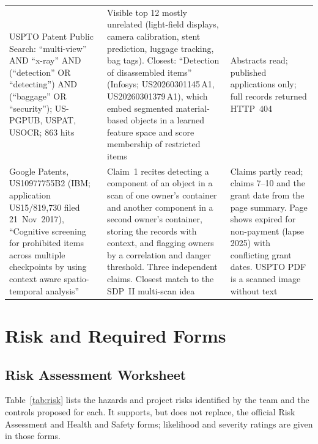 \begin{longtable}{@{}L{0.24\textwidth}L{0.44\textwidth}L{0.26\textwidth}@{}}
USPTO Patent Public Search: ``multi-view'' AND ``x-ray'' AND (``detection'' OR
``detecting'') AND (``baggage'' OR ``security''); US-PGPUB, USPAT, USOCR; 863 hits
& Visible top 12 mostly unrelated (light-field displays, camera calibration, stent
prediction, luggage tracking, bag tags). Closest: ``Detection of disassembled
items'' (Infosys; US20260301145\,A1, US20260301379\,A1), which embed segmented
material-based objects in a learned feature space and score membership of
restricted items & Abstracts read; published applications only; full records
returned HTTP~404\\
Google Patents, US10977755B2 (IBM; application US15/819,730 filed 21~Nov~2017),
``Cognitive screening for prohibited items across multiple checkpoints by using
context aware spatio-temporal analysis'' & Claim~1 recites detecting a component of
an object in a scan of one owner's container and another component in a second
owner's container, storing the records with context, and flagging owners by a
correlation and danger threshold. Three independent claims. Closest match to the
SDP~II multi-scan idea & Claims partly read; claims 7--10 and the grant date from
the page summary. Page shows expired for non-payment (lapse 2025) with conflicting
grant dates. USPTO PDF is a scanned image without text\\
\bottomrule
\end{longtable}
\endgroup

\chapter{Risk and Required Forms}\label{app:risk}

\section{Risk Assessment Worksheet}
Table~\ref{tab:risk} lists the hazards and project risks identified by the team and
the controls proposed for each. It supports, but does not replace, the official
Risk Assessment and Health and Safety forms; likelihood and severity
ratings are given in those forms.

